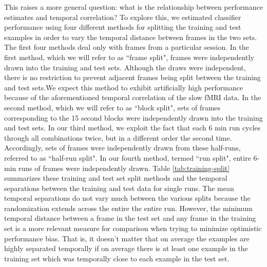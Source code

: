 \documentclass[preprint,5p,authoryear]{elsarticle}
\begin{document}
This raises a more general question: what is the relationship between performance estimates and temporal correlation?
To explore this, we estimated classifier performance using four different methods for splitting the training and test examples in order to vary the temporal distance between frames in the two sets. 
The first four methods deal only with frames from a particular session.
In the first method, which we will refer to as  ``frame split", frames were independently drawn into the training and test sets. 
Although the draws were independent, there is no restriction to prevent adjacent frames being split between the training and test sets.We expect this method to exhibit artificially high performance because of the aforementioned temporal correlation of the slow fMRI data.
In the second method, which we will refer to as ``block split", sets of frames corresponding to the 15 second blocks were independently drawn into the training and test sets.
In our third method, we exploit the fact that each 6 min run cycles through all combinations twice, but in a different order the second time.
Accordingly, sets of frames were independently drawn from these half-runs, referred to as ``half-run split". 
In our fourth method, termed ``run split", entire 6-min runs of frames were independently drawn. 
Table \ref{tab:training-split} summarizes these training and test set split methods and the temporal separations between the training and test data for single runs. 
The mean temporal separations do not vary much between the various splits because the randomization extends across the entire the entire run. 
However, the minimum temporal distance between a frame in the test set and any frame in the training set is a more relevant measure for comparison when trying to minimize optimistic performance bias.
That is, it doesn't matter that on average the examples are highly separated temporally if on average there is at least one example in the training set which was temporally close to each example in the test set.

\end{document}
